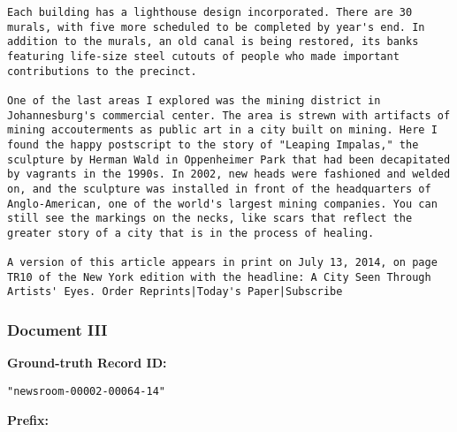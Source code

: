 \begin{lstlisting}
Each building has a lighthouse design incorporated. There are 30 murals, with five more scheduled to be completed by year's end. In addition to the murals, an old canal is being restored, its banks featuring life-size steel cutouts of people who made important contributions to the precinct.

One of the last areas I explored was the mining district in Johannesburg's commercial center. The area is strewn with artifacts of mining accouterments as public art in a city built on mining. Here I found the happy postscript to the story of "Leaping Impalas," the sculpture by Herman Wald in Oppenheimer Park that had been decapitated by vagrants in the 1990s. In 2002, new heads were fashioned and welded on, and the sculpture was installed in front of the headquarters of Anglo-American, one of the world's largest mining companies. You can still see the markings on the necks, like scars that reflect the greater story of a city that is in the process of healing.

A version of this article appears in print on July 13, 2014, on page TR10 of the New York edition with the headline: A City Seen Through Artists' Eyes. Order Reprints|Today's Paper|Subscribe

\end{lstlisting}

\newpage
\subsubsection{Document III}

{\bf\ttfamily Ground-truth Record ID:}
\begin{lstlisting}
"newsroom-00002-00064-14"
\end{lstlisting}

{\bf\ttfamily Prefix: }

